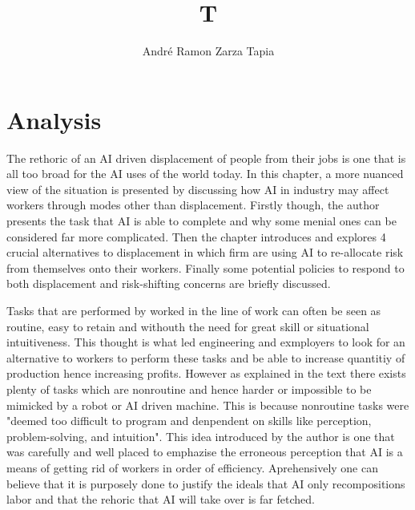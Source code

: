 \documentclass[a4paper,11pt,oneside]{report}
\title{T}
\author{André Ramon Zarza Tapia}
\begin{document}
\maketitle



\chapter{Analysis}

The rethoric of an AI driven displacement of people from their jobs is one that is all too broad for the AI uses of the world today. In this chapter, a more nuanced view of the situation is presented by discussing how AI in industry may affect workers through modes other than displacement. Firstly though, the author presents the task that AI is able to complete and why some menial ones can be considered far more complicated. Then the chapter introduces and explores 4 crucial alternatives to displacement in which firm are using AI to re-allocate risk from themselves onto their workers. Finally some potential policies to respond to both displacement and risk-shifting concerns are briefly discussed.

Tasks that are performed by worked in the line of work can often be seen as routine, easy to retain and withouth the need for great skill or situational intuitiveness. This thought is what led engineering and exmployers to look for an alternative to workers to perform these tasks and be able to increase quantitiy of production hence increasing profits. However as explained in the text there exists plenty of tasks which are nonroutine and hence harder or impossible to be mimicked by a robot or AI driven machine. This is because nonroutine tasks were "deemed too difficult to program and denpendent on skills like perception, problem-solving, and intuition". This idea introduced by the author is one that was carefully and well placed to emphazise the erroneous perception that AI is a means of getting rid of workers in order of efficiency. Aprehensively one can believe that it is purposely done to justify the ideals that AI only recompositions labor and that the rehoric that AI will take over is far fetched.
\end{document}
